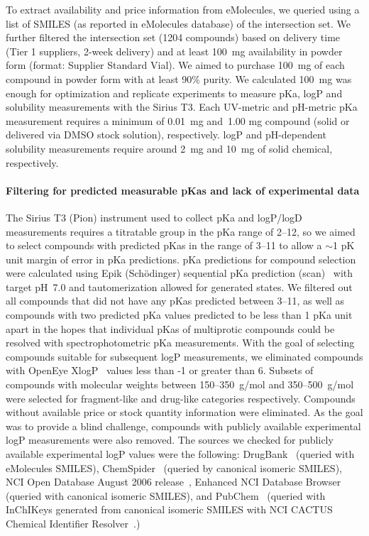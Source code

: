 \documentclass[9pt,lineno]{elife}
\begin{document}
To extract availability and price information from eMolecules, we queried using a list of SMILES (as reported in eMolecules database) of the intersection set. 
We further filtered the intersection set (1204 compounds) based on delivery time (Tier 1 suppliers, 2-week delivery) and at least 100~mg availability in powder form (format: Supplier Standard Vial).  We aimed to purchase 100~mg of each compound in powder form with at least 90\% purity. We calculated 100~mg was enough for optimization and replicate experiments to measure pKa, logP and solubility measurements with the Sirius T3. 
Each UV-metric and pH-metric pKa measurement requires a minimum of 0.01~mg and~1.00 mg compound (solid or delivered via DMSO stock solution), respectively. 
logP and pH-dependent solubility measurements require around 2~mg and 10~mg of solid chemical, respectively. 

\paragraph{Filtering for predicted measurable pKas and lack of experimental data}

The Sirius T3 (Pion) instrument used to collect pKa and logP/logD measurements requires a titratable group in the pKa range of 2--12, so we aimed to select compounds with predicted pKas in the range of 3--11 to allow a $\sim$1 pK unit margin of error in pKa predictions. 
pKa predictions for compound selection were calculated using Epik (Sch\"{o}dinger) sequential pKa prediction (scan)~\citep{shelley_epik:_2007,schrodinger_epik_v3_8} with target pH~7.0 and tautomerization allowed for generated states. 
We filtered out all compounds that did not have any pKas predicted between 3--11, as well as compounds with two predicted pKa values predicted to be less than 1 pKa unit apart in the hopes that individual pKas of multiprotic compounds could be resolved with spectrophotometric pKa measurements. 
With the goal of selecting compounds suitable for subsequent logP measurements, we eliminated compounds with OpenEye XlogP~\citep{oemolprop_openeye_2017} values less than -1 or greater than 6. 
Subsets of compounds with molecular weights between 150--350~g/mol and 350--500~g/mol were selected for fragment-like and drug-like categories respectively. 
Compounds without available price or stock quantity information were eliminated. 
As the goal was to provide a blind challenge, compounds with publicly available experimental logP measurements were also removed.
The sources we checked for publicly available experimental logP values were the following: DrugBank~\citep{wishart_drugbank:_2006} (queried with eMolecules SMILES), ChemSpider~\citep{pence_chemspider:_2010} (queried by canonical isomeric SMILES), NCI Open Database August 2006 release~\citep{nci_open_database_2006}, Enhanced NCI Database Browser~\citep{nci_database_browser} (queried with canonical isomeric SMILES), and PubChem~\citep{kim_pubchem_2016} (queried with InChIKeys generated from canonical isomeric SMILES with NCI CACTUS Chemical Identifier Resolver~\citep{nci_chem_id_resolver}.)
\end{document}

